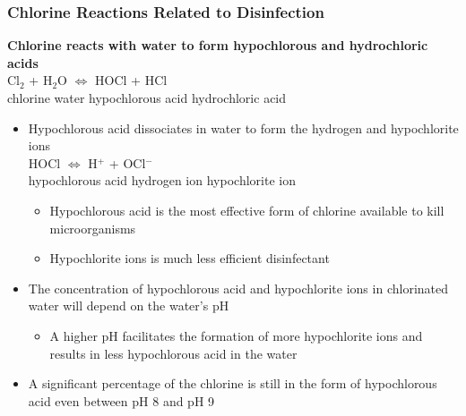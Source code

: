 \subsubsection{Chlorine Reactions Related to Disinfection}
\textbf{Chlorine reacts with water to form hypochlorous and hydrochloric acids}\\
Cl$_2$ \hspace{0.8cm}	+ \hspace{0.3 cm}	 H$_2$O		\hspace{0.8cm} $\iff$ 
\hspace{0.8cm} HOCl	\hspace{0.8cm}	 +	\hspace{0.8cm}	 HCl \\
chlorine \hspace{0.8cm}	water \hspace{1.8cm}		 hypochlorous acid	\hspace{0.1cm}	 hydrochloric acid\\ 
	\vspace{0.5cm}
	\begin{itemize}
		\item Hypochlorous acid dissociates in water to form the hydrogen and hypochlorite ions\\
 HOCl \hspace{1.8 cm} $\iff$ \hspace{1.8 cm} H$^+$ \hspace{1.8cm} + 	\hspace{0.8cm}OCl$^-$\\ 
hypochlorous acid  \hspace{1.9 cm}      hydrogen ion   \hspace{1.5cm}           hypochlorite ion

		\begin{itemize}
			\item Hypochlorous acid is the most effective form of chlorine available to kill microorganisms
			\item Hypochlorite ions is much less efficient disinfectant
		\end{itemize}

		\item The concentration of hypochlorous acid and hypochlorite ions in chlorinated water will depend on the water's pH
		\begin{itemize}
			\item A higher pH facilitates the formation of more hypochlorite ions and results in less hypochlorous acid in the water
		\end{itemize}
		\item A significant percentage of the chlorine is still in the form of hypochlorous acid even between pH 8 and pH 9
		\end{itemize}



